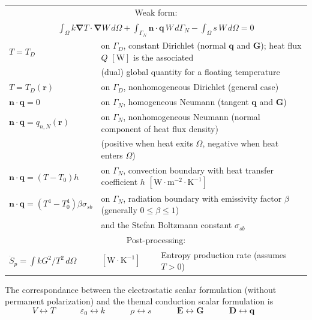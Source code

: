 \documentclass[letterpaper]{article}
\newcommand{\vect}[1]{\mathbf#1}
\newcommand{\nab}{\vect{\nabla}}
\begin{document}
\begin{table}[h!]
\begin{tabular}{lll}
\multicolumn{3}{c}{Weak form:} \\[1pt]
\multicolumn{3}{c}{$\displaystyle\int_\Omega k\nab T\cdot\nab W\,d\Omega+
\int_{\Gamma_N}\vect{n}\cdot\vect{q}\,W\,d{\Gamma_N}-
\int_\Omega s\,W\,d\Omega=0$}\\[8pt]
 $T=T_D$ & \multicolumn{2}{l}{on $\Gamma_D$, constant Dirichlet (normal $\vect{q}$ and $\vect{G}$); heat flux $Q$ $[\text{W}]$ is the associated}\\
 & \multicolumn{2}{l}{(dual) global quantity for a floating temperature}\\
 $T=T_D(\vect{r})$ & \multicolumn{2}{l}{on $\Gamma_D$, nonhomogeneous Dirichlet (general case)}\\
$\vect{n}\cdot\vect{q}=0$ & \multicolumn{2}{l}{on $\Gamma_N$, homogeneous Neumann (tangent $\vect{q}$ and $\vect{G}$)}\\
$\vect{n}\cdot\vect{q}=q_{n,N}(\vect{r})$ & \multicolumn{2}{l}{on $\Gamma_N$, nonhomogeneous Neumann (normal component of heat flux density)}\\
 & \multicolumn{2}{l}{(positive when heat exits $\Omega$, negative when heat enters $\Omega$)}\\
$\vect{n}\cdot\vect{q}=(T-T_{\!0})h$ & \multicolumn{2}{l}{on $\Gamma_N$, convection boundary with heat transfer coefficient $h$ $[\text{W}\cdot \text{m}^{-2} \cdot \text{K}^{-1}]$}\\
$\vect{n}\cdot\vect{q}=(T^4-T_{\!0}^4)\beta\sigma_{\!sb}$ & \multicolumn{2}{l}{on $\Gamma_N$, radiation boundary with emissivity factor $\beta$ (generally $0\leq\beta\leq1$)}\\
 & \multicolumn{2}{l}{and the Stefan Boltzmann constant $\sigma_{\!sb}$}\\

\hline
\multicolumn{3}{c}{Post-processing:} \\
$\dot{S}_{\!p}=\int k{G^2}/{T^2}\,d\Omega$ & $[\text{W}\cdot\text{K}^{-1}]$ & Entropy production rate (assumes $T>0$)\\[1pt]

\hline
\end{tabular}
\end{table}

The correspondance between the electrostatic scalar formulation (without permanent polarization) and the themal conduction scalar formulation is  
\begin{equation}
V\leftrightarrow T\qquad\quad
\varepsilon_0\leftrightarrow k \qquad\quad
\rho\leftrightarrow s\qquad\quad
\vect{E}\leftrightarrow\vect{G}\qquad\quad
\vect{D}\leftrightarrow\vect{q}\qquad\quad
\end{equation}
\end{document}
